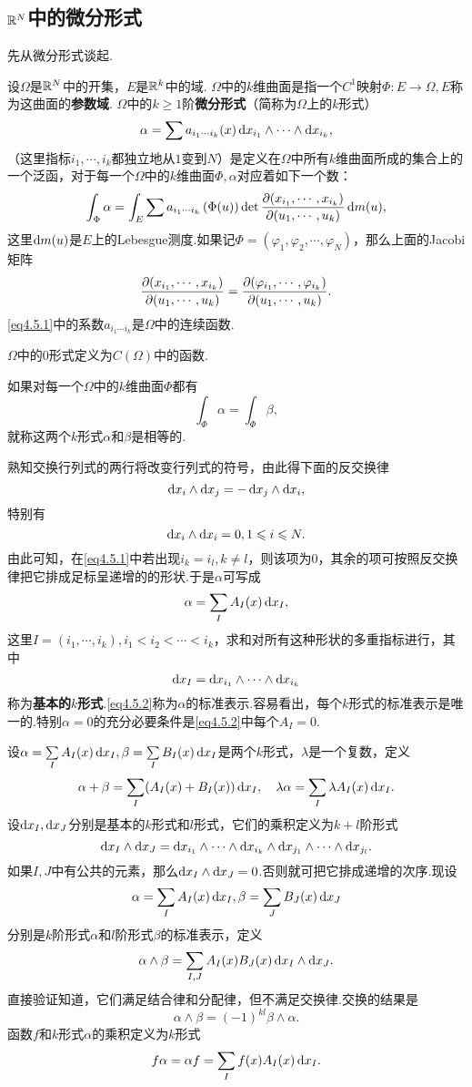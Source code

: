 \subsection{$\mathbb R^N$中的微分形式}
先从微分形式谈起.

设$\Omega$是$\mathbb R^N$中的开集，$E$是$\mathbb R^k$中的域. $\Omega$中的$k$维曲面是指一个$C^1$映射$\Phi\colon E\to\Omega,E$称为这曲面的\textbf{参数域}. $\Omega$中的$k\ge1$阶\textbf{微分形式}（简称为$\Omega$上的$k$形式）
\begin{equation}\label{eq4.5.1}
	\alpha=\sum a_{i_1\cdots i_k}(x)\mathop{}\!\mathrm dx_{i_1}\wedge\cdots\wedge\mathop{}\!\mathrm dx_{i_k},
\end{equation}
（这里指标$i_1,\cdots,i_k$都独立地从$1$变到$N$）是定义在$\Omega$中所有$k$维曲面所成的集合上的一个泛函，对于每一个$\Omega$中的$k$维曲面$\Phi,\alpha$对应着如下一个数：
\[\int_\Phi \alpha=\int_E \sum a_{i_1\cdots i_k}\left(\Phi(u)\right)\det\frac{\partial (x_{i_1},\cdots,x_{i_k})}{\partial (u_1,\cdots,u_k)}\mathop{}\!\mathrm{d} m(u),\]
这里$\mathop{}\!\mathrm{d} m(u)$是$E$上的Lebesgue测度.如果记$\Phi=(\varphi_1,\varphi_2,\cdots,\varphi_N)$，那么上面的Jacobi矩阵
\[\frac{\partial (x_{i_1},\cdots,x_{i_k})}{\partial (u_1,\cdots,u_k)}=\frac{\partial (\varphi_{i_1},\cdots,\varphi_{i_k})}{\partial (u_1,\cdots,u_k)}.\]
\eqref{eq4.5.1}中的系数$a_{i_1\cdots i_k}$是$\Omega$中的连续函数.

$\Omega$中的$0$形式定义为$C(\Omega)$中的函数.

如果对每一个$\Omega$中的$k$维曲面$\Phi$都有
\[\int_\Phi\alpha=\int_\Phi\beta,\]
就称这两个$k$形式$\alpha$和$\beta$是相等的.

熟知交换行列式的两行将改变行列式的符号，由此得下面的反交换律
\[\mathop{}\!\mathrm dx_i\wedge\mathop{}\!\mathrm dx_j=-\mathop{}\!\mathrm dx_j\wedge\mathop{}\!\mathrm dx_i,\]
特别有
\[\mathop{}\!\mathrm dx_i\wedge\mathop{}\!\mathrm dx_i=0,1\leqslant i\leqslant N.\]
由此可知，在\eqref{eq4.5.1}中若出现$i_k=i_l,k\neq l$，则该项为$0$，其余的项可按照反交换律把它排成足标呈递增的的形状.于是$\alpha$可写成
\begin{equation}\label{eq4.5.2}
	\alpha=\sum_I A_I(x)\mathop{}\!\mathrm dx_I,
\end{equation}
这里$I=(i_1,\cdots,i_k),i_1<i_2<\cdots<i_k$，求和对所有这种形状的多重指标进行，其中
\[\mathop{}\!\mathrm dx_I=\mathop{}\!\mathrm dx_{i_1}\wedge\cdots\wedge\mathop{}\!\mathrm dx_{i_k}\]
称为\textbf{基本的$k$形式}.\eqref{eq4.5.2}称为$\alpha$的标准表示.容易看出，每个$k$形式的标准表示是唯一的.特别$\alpha=0$的充分必要条件是\eqref{eq4.5.2}中每个$A_I=0$.

设$\alpha=\sum\limits_I A_I(x)\mathop{}\!\mathrm dx_I,\beta=\sum\limits_I B_I(x)\mathop{}\!\mathrm dx_I$是两个$k$形式，$\lambda$是一个复数，定义
\[\alpha+\beta=\sum_I (A_I(x)+B_I(x))\mathop{}\!\mathrm dx_I,\quad\lambda\alpha=\sum_I\lambda A_I(x)\mathop{}\!\mathrm dx_I.\]
设$\mathop{}\!\mathrm dx_I,\mathop{}\!\mathrm dx_J$分别是基本的$k$形式和$l$形式，它们的乘积定义为$k+l$阶形式
\[\mathop{}\!\mathrm dx_I\wedge\mathop{}\!\mathrm dx_J=\mathop{}\!\mathrm dx_{i_1}\wedge\cdots\wedge\mathop{}\!\mathrm dx_{i_k}\wedge\mathop{}\!\mathrm dx_{j_1}\wedge\cdots\wedge\mathop{}\!\mathrm dx_{j_l}.\]
如果$I,J$中有公共的元素，那么$\mathop{}\!\mathrm dx_I\wedge\mathop{}\!\mathrm dx_J=0$.否则就可把它排成递增的次序.现设
\[\alpha=\sum_I A_I(x)\mathop{}\!\mathrm dx_I,\beta=\sum_J B_J(x)\mathop{}\!\mathrm dx_J\]
分别是$k$阶形式$\alpha$和$l$阶形式$\beta$的标准表示，定义
\[\alpha\wedge\beta=\sum_{I,J}A_I(x)B_J(x)\mathop{}\!\mathrm dx_I\wedge\mathop{}\!\mathrm dx_J.\]
直接验证知道，它们满足结合律和分配律，但不满足交换律.交换的结果是
\[\alpha\wedge\beta=(-1)^{kl}\beta\wedge\alpha.\]
函数$f$和$k$形式$\alpha$的乘积定义为$k$形式
\[f\alpha=\alpha f=\sum_I f(x)A_I(x)\mathop{}\!\mathrm dx_I.\]

